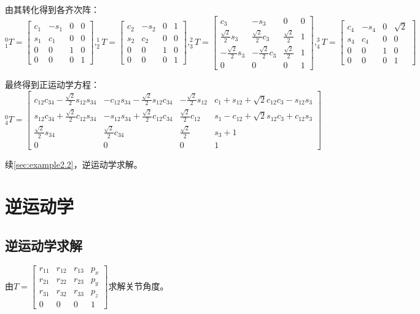 \documentclass[
12pt, %
a4paper, 
oneside, %
headinclude,footinclude, %
]{scrartcl}
\begin{document}
{\footnotesize
由其转化得到各齐次阵：
$$
^0_1T = \begin{bmatrix} c_1 & -s_1 & 0 & 0 \\ s_1 & c_1 & 0 & 0 \\ 0 & 0 & 1 & 0 \\ 0 & 0 & 0 & 1 \end{bmatrix},
^1_2T = \begin{bmatrix} c_2 & -s_2 & 0 & 1 \\ s_2 & c_2 & 0 & 0 \\ 0 & 0 & 1 & 0 \\ 0 & 0 & 0 & 1 \end{bmatrix},
^2_3T = \begin{bmatrix} c_3 & -s_3 & 0 & 0 \\ \frac{\sqrt{2}}{2}s_3 & \frac{\sqrt{2}}{2}c_3 & \frac{\sqrt{2}}{2} & 1 \\ -\frac{\sqrt{2}}{2}s_3 & -\frac{\sqrt{2}}{2}c_3 & \frac{\sqrt{2}}{2} & 1 \\ 0 & 0 & 0 & 1 \end{bmatrix},
^3_4T = \begin{bmatrix} c_4 & -s_4 & 0 & \sqrt{2} \\ s_4 & c_4 & 0 & 0 \\ 0 & 0 & 1 & 0 \\ 0 & 0 & 0 & 1 \end{bmatrix}
$$

最终得到正运动学方程：
$$ ^0_4T = \begin{bmatrix} c_{12}c_{34} - \frac{\sqrt{2}}{2}s_{12}s_{34} & -c_{12}s_{34} - \frac{\sqrt{2}}{2}s_{12}c_{34} & -\frac{\sqrt{2}}{2}s_{12} & c_1 + s_{12} + \sqrt{2}c_{12}c_3 - s_{12}s_3 \\ s_{12}c_{34} + \frac{\sqrt{2}}{2}c_{12}s_{34} & -s_{12}s_{34} + \frac{\sqrt{2}}{2}c_{12}c_{34} & \frac{\sqrt{2}}{2}c_{12} & s_1 - c_{12} + \sqrt{2}s_{12}c_3 + c_{12}s_3 \\ \frac{\sqrt{2}}{2}s_{34} & \frac{\sqrt{2}}{2}c_{34} & \frac{\sqrt{2}}{2} & s_3 + 1 \\ 0 & 0 & 0 & 1 \end{bmatrix} $$

续\ref{sec:example2.2}，逆运动学求解。
}
\section{逆运动学}
\subsection[逆运动学求解]{逆运动学求解}
由$ T = \begin{bmatrix} r_{11} & r_{12} & r_{13} & p_x \\ r_{21} & r_{22} & r_{23} & p_y \\ r_{31} & r_{32} & r_{33} & p_z \\ 0 & 0 & 0 & 1 \end{bmatrix} $求解关节角度。
\end{document}
